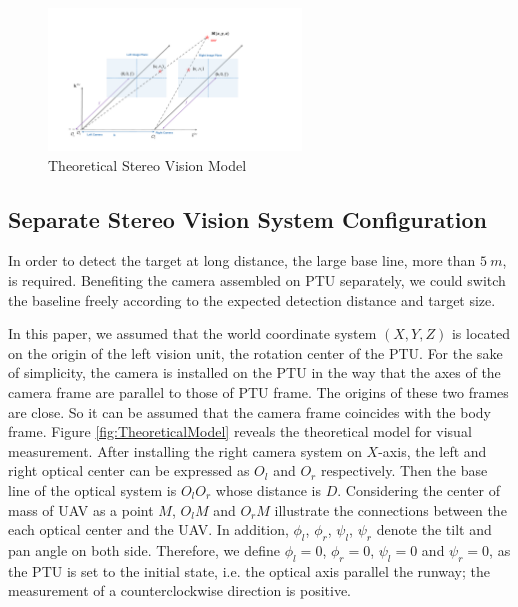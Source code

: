 \documentclass[journal,article,submit,moreauthors,pdftex,10pt,a4paper]{mdpi}
\begin{document}
\begin{figure}[!t]
	\centering
	\includegraphics[width=0.6\textwidth]{figs/chp03_vision_20_basic_stereo.pdf}	
	\caption{Theoretical Stereo Vision Model}
	\label{fig:chp03_vision_20_basic_stereo}
\end{figure}


\subsection{Separate Stereo Vision System Configuration}
In order to detect the target at long distance, the large base line, more than $5\ m $, is required. Benefiting the camera assembled on PTU separately, we could switch the baseline freely according to the expected detection distance and target size.

In this paper, we assumed that the world coordinate system $(X, Y, Z)$ is located on the origin of the left vision unit, the rotation center of the PTU. For the sake of simplicity, the camera is installed on the PTU in the way that the axes of the camera frame are parallel to those of PTU frame. The origins of these two frames are close. So it can be assumed that the camera frame coincides with the body frame. Figure  \ref{fig:TheoreticalModel} reveals the theoretical model for visual measurement. After installing the right camera system on ${X}$-axis, the left and right optical center can be expressed as ${O_l}$ and ${O_r}$ respectively. Then the base line of the optical system is $O_lO_r$ whose distance is ${D}$. Considering the center of mass of UAV as a point ${M}$, ${O_lM}$ and ${O_rM}$ illustrate the connections between the each optical center and the UAV. In addition, ${\phi_l}$, ${\phi_r}$, ${\psi_l}$, ${\psi_r}$ denote the tilt and pan angle on both side. Therefore, we define $\phi_l= 0$, $\phi_r=0$, ${\psi_l=0}$ and ${\psi_r=0}$, as the PTU is set to the initial state, i.e. the optical axis parallel the runway; the measurement of a counterclockwise direction is positive.
\end{document}
